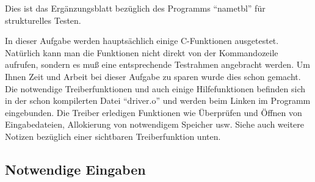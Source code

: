 
Dies ist das Erg\"anzungsblatt bez\"uglich des Programms "`nametbl"'
f\"ur strukturelles Testen.

\bigskip

In dieser Aufgabe werden haupts\"achlich einige C-Funktionen
ausgetestet.  Nat\"urlich kann man die Funktionen nicht direkt
von der Kommandozeile aufrufen, sondern es mu{\ss} eine entsprechende
Testrahmen angebracht werden.  Um Ihnen Zeit und Arbeit bei dieser
Aufgabe zu sparen wurde dies schon gemacht.  Die notwendige
Treiberfunktionen und auch einige Hilfefunktionen befinden sich in der
schon kompilerten Datei "`driver.o"' und werden beim Linken im
Programm eingebunden.   Die Treiber erledigen Funktionen wie
\"Uberpr\"ufen und \"Offnen von Eingabedateien, Allokierung von
notwendigem Speicher usw.  Siehe auch weitere Notizen bez\"uglich
einer sichtbaren Treiberfunktion unten. 

\subsection*{Notwendige Eingaben}


